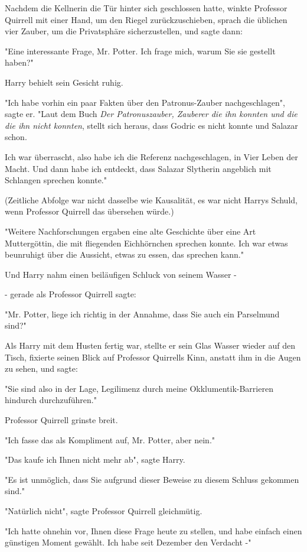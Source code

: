 {Nachdem die Kellnerin die Tür hinter sich geschlossen hatte, winkte Professor Quirrell mit einer Hand, um den Riegel zurückzuschieben, sprach die üblichen vier Zauber, um die Privatsphäre sicherzustellen, und sagte dann:

"Eine interessante Frage, Mr. Potter. Ich frage mich, warum Sie sie gestellt haben?"

Harry behielt sein Gesicht ruhig.

"Ich habe vorhin ein paar Fakten über den Patronus-Zauber nachgeschlagen", sagte er. "Laut dem Buch \emph{Der Patronuszauber, Zauberer die ihn konnten und die die ihn nicht konnten}, stellt sich heraus, dass Godric es nicht konnte und Salazar schon.

Ich war überrascht, also habe ich die Referenz nachgeschlagen, in Vier Leben der Macht. Und dann habe ich entdeckt, dass Salazar Slytherin angeblich mit Schlangen sprechen konnte."

(Zeitliche Abfolge war nicht dasselbe wie Kausalität, es war nicht Harrys Schuld, wenn Professor Quirrell das übersehen würde.)

"Weitere Nachforschungen ergaben eine alte Geschichte über eine Art Muttergöttin, die mit fliegenden Eichhörnchen sprechen konnte. Ich war etwas beunruhigt über die Aussicht, etwas zu essen, das sprechen kann."

Und Harry nahm einen beiläufigen Schluck von seinem Wasser -

- gerade als Professor Quirrell sagte:

"Mr. Potter, liege ich richtig in der Annahme, dass Sie auch ein Parselmund sind?"

Als Harry mit dem Husten fertig war, stellte er sein Glas Wasser wieder auf den Tisch, fixierte seinen Blick auf Professor Quirrells Kinn, anstatt ihm in die Augen zu sehen, und sagte:

"Sie sind also in der Lage, Legilimenz durch meine Okklumentik-Barrieren hindurch durchzuführen."

Professor Quirrell grinste breit.

"Ich fasse das als Kompliment auf, Mr. Potter, aber nein."

"Das kaufe ich Ihnen nicht mehr ab", sagte Harry.

"Es ist unmöglich, dass Sie aufgrund dieser Beweise zu diesem Schluss gekommen sind."

"Natürlich nicht", sagte Professor Quirrell gleichmütig.

"Ich hatte ohnehin vor, Ihnen diese Frage heute zu stellen, und habe einfach einen günstigen Moment gewählt. Ich habe seit Dezember den Verdacht -"

}
